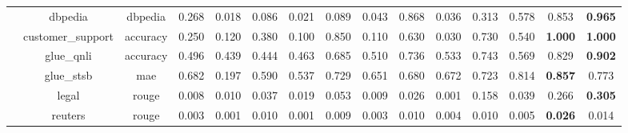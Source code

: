 \begin{table}[]
{\begin{tabular}{ccccccccccccccc}
                                   & dbpedia                        & dbpedia                          & 0.268              & 0.018             & 0.086                      & 0.021             & 0.089                      & 0.043               & 0.868                    & 0.036               & 0.313                        & 0.578                   & 0.853                  & \textbf{0.965} \\
                                   & customer\_support              & accuracy                         & 0.250              & 0.120             & 0.380                      & 0.100             & 0.850                      & 0.110               & 0.630                    & 0.030               & 0.730                        & 0.540                   & \textbf{1.000}         & \textbf{1.000} \\
                                   & glue\_qnli                     & accuracy                         & 0.496              & 0.439             & 0.444                      & 0.463             & 0.685                      & 0.510               & 0.736                    & 0.533               & 0.743                        & 0.569                   & 0.829                  & \textbf{0.902} \\
                                   & glue\_stsb                     & mae                              & 0.682              & 0.197             & 0.590                      & 0.537             & 0.729                      & 0.651               & 0.680                    & 0.672               & 0.723                        & 0.814                   & \textbf{0.857}         & 0.773          \\
                                   & legal                          & rouge                            & 0.008              & 0.010             & 0.037                      & 0.019             & 0.053                      & 0.009               & 0.026                    & 0.001               & 0.158                        & 0.039                   & 0.266                  & \textbf{0.305} \\
                                   & reuters                        & rouge                            & 0.003              & 0.001             & 0.010                      & 0.001             & 0.009                      & 0.003               & 0.010                    & 0.004               & 0.010                        & 0.005                   & \textbf{0.026}         & 0.014          \\

\end{tabular}}
\end{table}
